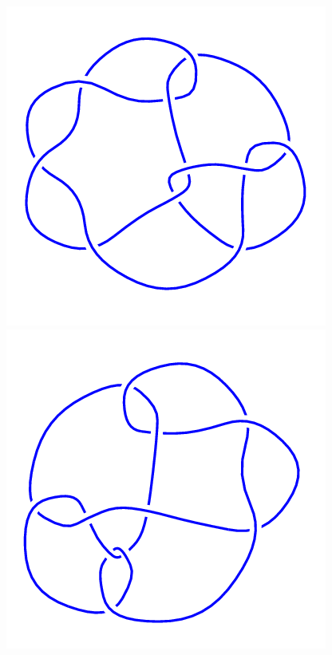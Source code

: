 \begin{figure}[H]
    \begin{minipage}[b]{.18\linewidth}
        \centering
        \includegraphics[width=\linewidth]{../data/10_132.png}
    \end{minipage}
    \begin{minipage}[b]{.18\linewidth}
        \centering
        \includegraphics[width=\linewidth]{../data/10_133.png}

\end{minipage}
\end{figure}
